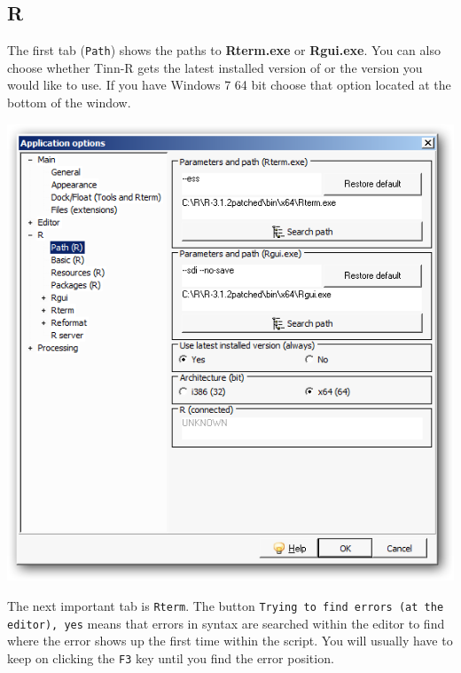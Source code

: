\subsection{R}

The first tab (\texttt{Path}) shows the paths to \textbf{Rterm.exe} or \textbf{Rgui.exe}.
You can also choose whether Tinn-R gets the latest installed version of \RR{} or the version you would like to use.
If you have Windows 7 64 bit choose that option located at the bottom of the window.

\includegraphics[scale=0.50]{./res/app_r_path.png}

The next important tab is \texttt{Rterm}. The button \texttt{Trying to find errors (at the editor), yes}
means that errors in \RR{} syntax are searched within the editor to find where the error shows up the first
time within the script. You will usually have to keep on clicking the \texttt{F3} key until you find the error position.

